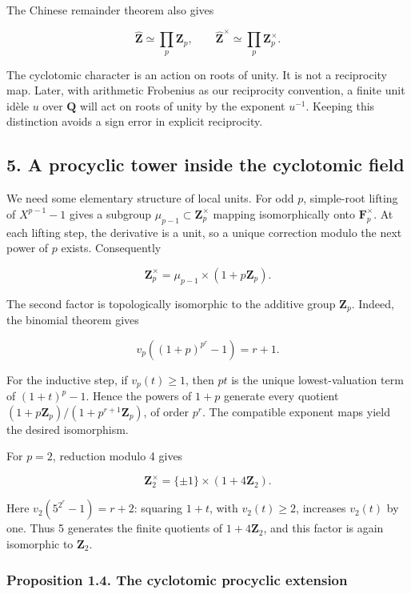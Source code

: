 \documentclass[11pt,a4paper]{article}
\begin{document}
The Chinese remainder theorem also gives

\[
\widehat{\mathbf Z}\simeq\prod_p\mathbf Z_p,
\qquad
\widehat{\mathbf Z}^{\times}\simeq\prod_p\mathbf Z_p^{\times}.
\]

The cyclotomic character is an action on roots of unity. It is not a
reciprocity map. Later, with arithmetic Frobenius as our reciprocity
convention, a finite unit idèle \(u\) over \(\mathbf Q\) will act on
roots of unity by the exponent \(u^{-1}\). Keeping this distinction
avoids a sign error in explicit reciprocity.

\subsection{5. A procyclic tower inside the cyclotomic
field}\label{a-procyclic-tower-inside-the-cyclotomic-field}

We need some elementary structure of local units. For odd \(p\),
simple-root lifting of \(X^{p-1}-1\) gives a subgroup
\(\mu_{p-1}\subset\mathbf Z_p^\times\) mapping isomorphically onto
\(\mathbf F_p^\times\). At each lifting step, the derivative is a unit,
so a unique correction modulo the next power of \(p\) exists.
Consequently

\[
\mathbf Z_p^\times=\mu_{p-1}\times(1+p\mathbf Z_p).
\]

The second factor is topologically isomorphic to the additive group
\(\mathbf Z_p\). Indeed, the binomial theorem gives

\[
v_p((1+p)^{p^r}-1)=r+1.
\]

For the inductive step, if \(v_p(t)\geq1\), then \(pt\) is the unique
lowest-valuation term of \((1+t)^p-1\). Hence the powers of \(1+p\)
generate every quotient \((1+p\mathbf Z_p)/(1+p^{r+1}\mathbf Z_p)\), of
order \(p^r\). The compatible exponent maps yield the desired
isomorphism.

For \(p=2\), reduction modulo 4 gives

\[
\mathbf Z_2^\times=\{\pm1\}\times(1+4\mathbf Z_2).
\]

Here \(v_2(5^{2^r}-1)=r+2\): squaring \(1+t\), with \(v_2(t)\geq2\),
increases \(v_2(t)\) by one. Thus 5 generates the finite quotients of
\(1+4\mathbf Z_2\), and this factor is again isomorphic to
\(\mathbf Z_2\).

\subsubsection{Proposition 1.4. The cyclotomic procyclic
extension}\label{proposition-1.4.-the-cyclotomic-procyclic-extension}
\end{document}
